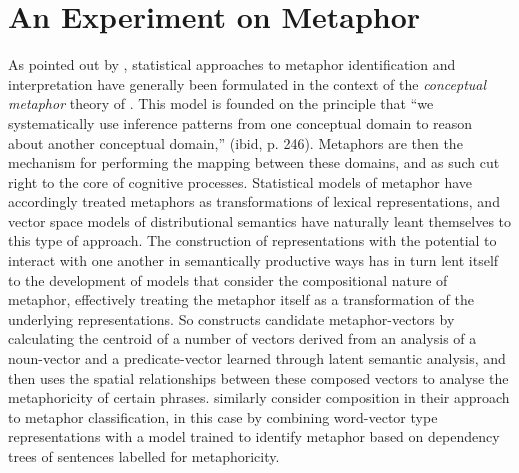 \section{An Experiment on Metaphor}
As pointed out by \cite{ShutovaEA2013}, statistical approaches to metaphor identification and interpretation have generally been formulated in the context of the \emph{conceptual metaphor} theory of \cite{LakoffEA2003}.  This model is founded on the principle that ``we systematically use inference patterns from one conceptual domain to reason about another conceptual domain,'' (ibid, p. 246).  Metaphors are then the mechanism for performing the mapping between these domains, and as such cut right to the core of cognitive processes.  Statistical models of metaphor have accordingly treated metaphors as transformations of lexical representations, and vector space models of distributional semantics have naturally leant themselves to this type of approach.  The construction of representations with the potential to interact with one another in semantically productive ways has in turn lent itself to the development of models that consider the compositional nature of metaphor, effectively treating the metaphor itself as a transformation of the underlying representations.  So \cite{Utsumi2011} constructs candidate metaphor-vectors by calculating the centroid of a number of vectors derived from an analysis of a noun-vector and a predicate-vector learned through latent semantic analysis, and then uses the spatial relationships between these composed vectors to analyse the metaphoricity of certain phrases.  \cite{HovyEA2013} similarly consider composition in their approach to metaphor classification, in this case by combining word-vector type representations with a model trained to identify metaphor based on dependency trees of sentences labelled for metaphoricity.

